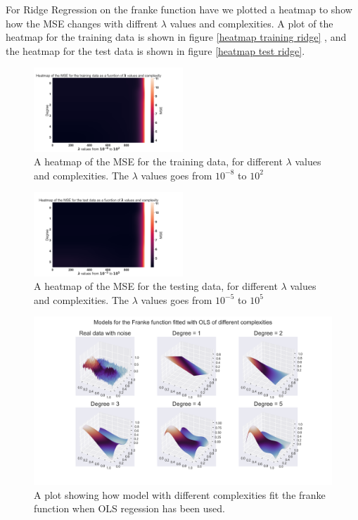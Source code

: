 \noindent For Ridge Regression on the franke function have we plotted a heatmap to show 
how the MSE changes with diffrent $\lambda$ values and complexities. A plot of
the heatmap for the training data is shown in figure \eqref{heatmap training ridge}
, and the heatmap for the test data is shown in figure \eqref{heatmap test ridge}.
\begin{figure}[h]
	\centering
	\includegraphics[width=0.5\textwidth]{Figure_8.png}
	\caption{A heatmap of the MSE for the training data, for different $\lambda$ values and complexities. The $\lambda$ values goes from $10^{-8}$ to $10^{2}$ }
	\label{heatmap training ridge}
\end{figure}
\begin{figure}[h]
	\centering
	\includegraphics[width=0.5\textwidth]{Figure_7.png}
	\caption{A heatmap of the MSE for the testing data, for different $\lambda$ values and complexities. The $\lambda$ values goes from $10^{-5}$ to $10^{5}$}
	\label{heatmap test ridge}
\end{figure}





\begin{figure}[h]
	\centering
	\includegraphics[width=\textwidth]{Figure_2.png}
	\caption{A plot showing how model with different complexities fit the franke function when OLS regession has been used.}
	\label{OLS figure}
\end{figure}


